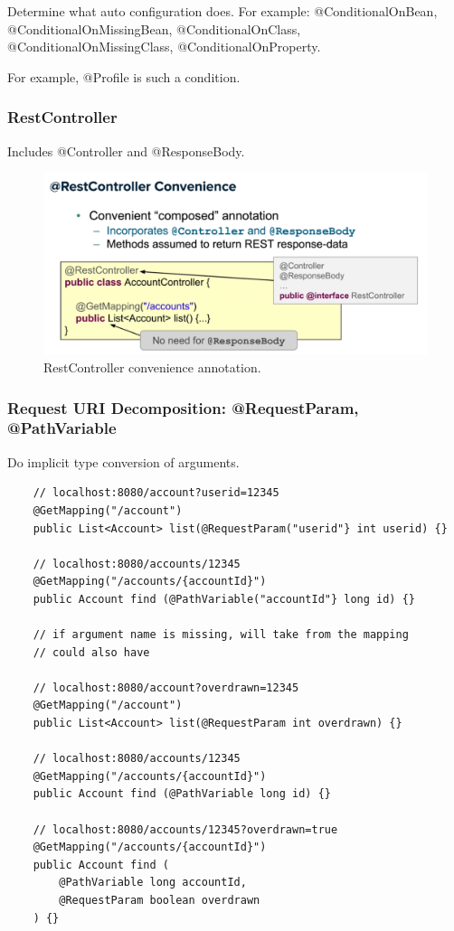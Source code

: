 \documentclass{scrartcl}
\begin{document}
Determine what auto configuration does. For example: @ConditionalOnBean, @ConditionalOnMissingBean, @ConditionalOnClass, @ConditionalOnMissingClass, @ConditionalOnProperty.

For example, @Profile is such a condition.

\subsubsection{RestController}

Includes @Controller and @ResponseBody.

\begin{figure}
    \centering
    \includegraphics[width=1\linewidth]{restcontroller}
    \caption{RestController convenience annotation.}
    \label{fig:restcontroller}
\end{figure}

\subsubsection{Request URI Decomposition: @RequestParam, @PathVariable}

Do implicit type conversion of arguments.

\begin{lstlisting}
    // localhost:8080/account?userid=12345
    @GetMapping("/account")
    public List<Account> list(@RequestParam("userid"} int userid) {}

    // localhost:8080/accounts/12345
    @GetMapping("/accounts/{accountId}")
    public Account find (@PathVariable("accountId"} long id) {}

    // if argument name is missing, will take from the mapping
    // could also have

    // localhost:8080/account?overdrawn=12345
    @GetMapping("/account")
    public List<Account> list(@RequestParam int overdrawn) {}

    // localhost:8080/accounts/12345
    @GetMapping("/accounts/{accountId}")
    public Account find (@PathVariable long id) {}

    // localhost:8080/accounts/12345?overdrawn=true
    @GetMapping("/accounts/{accountId}")
    public Account find (
        @PathVariable long accountId,
        @RequestParam boolean overdrawn
    ) {}



\end{lstlisting}
\end{document}

